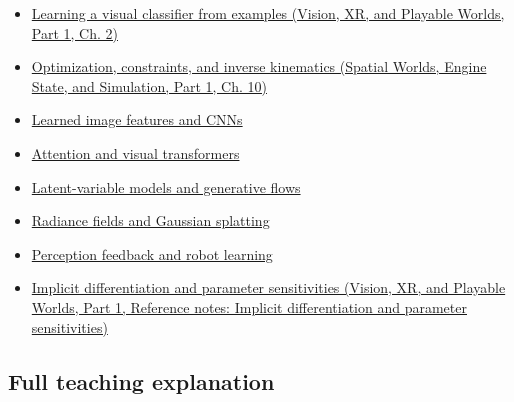 \hypertarget{appendix-40df0855b4a7-used-by}{}

\begin{itemize}
\tightlist
\item
  \href{../07-Vision-XR-and-Playable-Worlds-P01/main.pdf\#nameddest=04-visual-computing-ii-ch031-learning-a-visual-classifier-from-examples}{Learning a visual classifier from examples (Vision, XR, and Playable Worlds, Part 1, Ch. 2)}
\item
  \href{../05-Spatial-Worlds-Engine-State-and-Simulation-P01/main.pdf\#nameddest=04-visual-computing-ii-ch029-optimization-constraints-and-inverse-kinematics}{Optimization, constraints, and inverse kinematics (Spatial Worlds, Engine State, and Simulation, Part 1, Ch. 10)}
\item
  \hyperref[appendix-47c51ea026fb]{Learned image features and CNNs}
\item
  \hyperref[appendix-a9d5dfdd164a]{Attention and visual transformers}
\item
  \hyperref[appendix-2c568f05ee34]{Latent-variable models and generative flows}
\item
  \hyperref[appendix-c5b332e400e7]{Radiance fields and Gaussian splatting}
\item
  \hyperref[appendix-b0c42da325f1]{Perception feedback and robot learning}
\item
  \href{../07-Vision-XR-and-Playable-Worlds-P01/main.pdf\#nameddest=appendix-8836553d56fc}{Implicit differentiation and parameter sensitivities (Vision, XR, and Playable Worlds, Part 1, Reference notes: Implicit differentiation and parameter sensitivities)}
\end{itemize}

\subsection{Full teaching explanation}\label{appendix-40df0855b4a7-full-teaching-explanation}

\hypertarget{appendix-40df0855b4a7-full-teaching-explanation}{}

